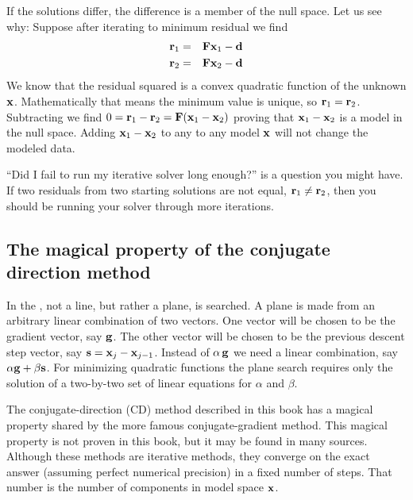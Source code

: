 If the solutions differ, the difference
is a member of the null space.
Let us see why:
Suppose after iterating to minimum residual we find
\begin{eqnarray}
\bold r_1 &=& \bold F\bold x_1 - \bold d
\\
\bold r_2 &=& \bold F\bold x_2 - \bold d 
\end{eqnarray}
We know that the residual squared is a convex quadratic function
of the unknown $\bold x$.
Mathematically that means the minimum value is unique,
so $\bold r_1 =\bold r_2$.
Subtracting
we find
$0=\bold r_1-\bold r_2 =\bold F(\bold x_1-\bold x_2)$
proving that $\bold x_1-\bold x_2$ is a model in the null space.
Adding $\bold x_1-\bold x_2$ to any to any model $\bold x$
will not change the modeled data.

\par
{}
\par
``Did I fail to run my iterative solver long enough?'' is
a question you might have.
If two residuals from two starting solutions are not equal,
$\bold r_1 \ne \bold r_2$,
then you should be running your solver through more iterations.
\par
{}

\subsection{The magical property of the conjugate direction method}
In the , not a line, but rather a plane,
is searched.
A plane is made from an arbitrary linear combination of two vectors.
One vector will be chosen to be the gradient vector, say  $\bold g$.
The other vector will be chosen to be the previous descent step vector,
say  $\bold s = \bold x_j - \bold x_{j-1}$.
Instead of  $\alpha \, \bold g$  we need a linear combination,
say  $\alpha \bold g + \beta  \bold s$.
For minimizing quadratic functions the plane search requires
only the solution of a two-by-two set of linear equations
for  $\alpha$  and  $\beta$.
\par
The conjugate-direction (CD) method described in this book
has a magical property shared by the more famous conjugate-gradient method.
This magical property is not proven in this book,
but it may be found in many sources.
Although these methods are iterative methods,
they converge on the exact answer (assuming perfect numerical precision)
in a fixed number of steps.
That number is the number of components in model space $\bold x$.

